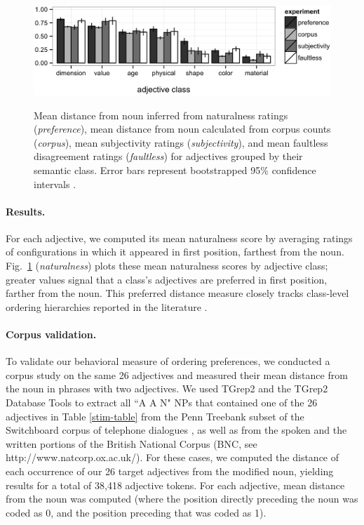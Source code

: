 \documentclass[manuscript]{stjour}
\begin{document}
\begin{figure}[tbh]
	\centering
	{\includegraphics[width=.75\linewidth]{plots/expt_results-new.eps}}\par
	\caption{Mean distance from noun inferred from naturalness ratings (\emph{preference}), mean distance from noun calculated from corpus counts (\emph{corpus}), mean subjectivity ratings (\emph{subjectivity}), and mean faultless disagreement ratings (\emph{faultless}) for adjectives grouped by their semantic class. Error bars represent bootstrapped 95\% confidence intervals 
	\citep{DiCiccio1996}.}\label{results}
\end{figure}

\paragraph{Results.} For each adjective, we computed its mean naturalness score by averaging ratings of configurations in which it appeared in first position, farthest from the noun. Fig.\ \ref{results} (\emph{naturalness}) plots these mean naturalness scores by adjective class; greater values signal that a class's adjectives are preferred in first position, farther from 
the noun. This preferred distance measure closely tracks class-level ordering hierarchies reported in the literature \citep{dixon1982,Sproat1991}.

\paragraph{Corpus validation.} To validate our behavioral measure of ordering preferences, we conducted a corpus study on the same 26 adjectives and measured their mean distance from the noun in phrases with two adjectives. We used TGrep2 \citep{rohde2005} and the TGrep2 Database Tools \citep{Degen2011} to extract all ``A A N"  NPs that contained one of the 26 adjectives in Table \ref{stim-table} from the Penn Treebank subset of the Switchboard corpus of telephone dialogues \citep{godfrey1992}, as well as from the spoken and the written portions of the British National Corpus (BNC, see http://www.natcorp.ox.ac.uk/). For these cases, we computed the distance of each occurrence of our 26 target adjectives from the modified noun, yielding results for a total of 38,418 adjective tokens.  For each adjective, mean distance from the noun was computed (where the position directly preceding the noun was coded as 0, and the position preceding that was coded as 1). %
\end{document}
